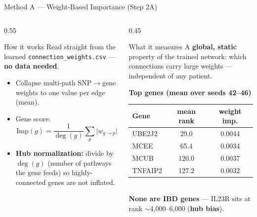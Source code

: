 \documentclass[aspectratio=169]{beamer}
\begin{document}
\begin{frame}{Method A — Weight-Based Importance (Step 2A)}
    \small
    \begin{columns}[T]
        \begin{column}{0.55\textwidth}
            \begin{block}{How it works}
                \footnotesize
                Read straight from the learned \texttt{connection\_weights.csv} --- \textbf{no data needed}.
                \begin{itemize}
                    \item Collapse multi-path SNP$\to$gene weights to one value per edge (mean).
                    \item Gene score:
                          \[ \mathrm{Imp}(g)=\frac{1}{\deg(g)}\sum_{p}\bigl\lvert w_{g\to p}\bigr\rvert \]
                    \item \textbf{Hub normalization:} divide by $\deg(g)$ (number of pathways the gene feeds) so highly-connected genes are not inflated.
                \end{itemize}
            \end{block}
        \end{column}
        \begin{column}{0.45\textwidth}
            \begin{block}{What it measures}
                \footnotesize
                A \textbf{global, static} property of the trained network: which connections carry large weights --- independent of any patient.
            \end{block}
            \centering
            \scriptsize
            \textbf{Top genes (mean over seeds 42--46)}\\[2pt]
            \begin{tabular}{l c c}
                \toprule
                Gene & mean rank & weight imp. \\
                \midrule
                UBE2J2  & 29.0  & 0.0044 \\
                MCEE    & 65.4  & 0.0034 \\
                MCUB    & 120.0 & 0.0037 \\
                TNFAIP2 & 127.2 & 0.0032 \\
                \bottomrule
            \end{tabular}\\[3pt]
            \footnotesize \textbf{None are IBD genes} --- IL23R sits at rank $\sim$4{,}000--6{,}000 (\textbf{hub bias}).
        \end{column}
    \end{columns}
\end{frame}
\end{document}
